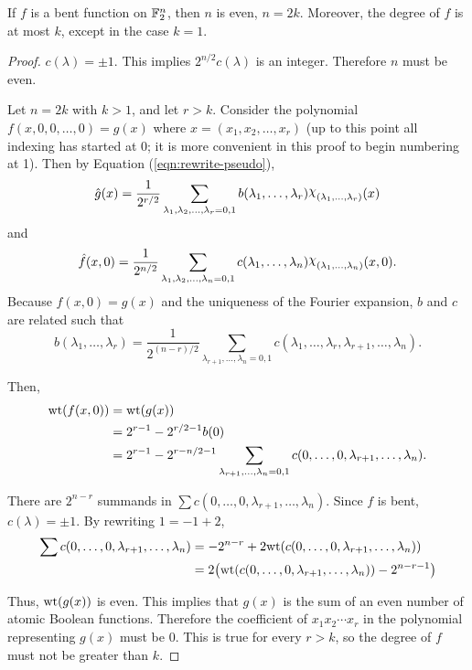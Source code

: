 \begin{proposition}{\rm \cite{art:r76}}
  If $f$ is a bent function on $\mathbb{F}_2^n$, then $n$ is even, $n=2k$.
  Moreover,
  the degree of $f$ is at most $k$, except in the case $k=1$.
\end{proposition}
\begin{proof}
  \par $c(\lambda)=\pm1$. This implies $2^{n/2}c(\lambda)$ is an
  integer. Therefore $n$ must be even.
  \par Let $n=2k$ with $k>1$, and let $r>k$. Consider the polynomial
  $f(x,\allowbreak 0,0,\dots,0)=\allowbreak g(x)$ where $x=(x_1,x_2,\dots,x_r)$
  (up to this point all indexing has
  started at 0; it is more convenient in this proof to begin numbering at
  1). Then by Equation (\ref{eqn:rewrite-pseudo}),
  \[
  \hat{g}(x)=\frac{1}{2^{r/2}}\sum_{\lambda_1,\lambda_2,\dots,\lambda_r=0,1}
    b(\lambda_1,\dots,\lambda_r)\Chi_{(\lambda_1,\ldots,\lambda_r)}(x)
  \]
  and
  \[
  \hat{f}(x,0)=\frac{1}{2^{n/2}}
    \sum_{\lambda_1,\lambda_2,\dots,\lambda_n=0,1}
    c(\lambda_1,\dots,\lambda_n)\Chi_{(\lambda_1,\ldots,\lambda_n)}(x,0).
  \]
  Because $f(x,0)=g(x)$ and the uniqueness of the Fourier expansion, $b$ and
  $c$ are related such that
  \[
  b(\lambda_1,\dots,\lambda_r)
    =\frac{1}{2^{(n-r)/2}}\sum_{\lambda_{r+1},\dots,\lambda_n=0,1}
    c(\lambda_1,\dots,\lambda_r,\lambda_{r+1},\dots,\lambda_n).
  \]
  \par Then,
  \begin{align*}
  {\rm wt}(f(x,0))&={\rm wt}(g(x))\\
    &=2^{r-1}-2^{r/2-1}b(0)\\
    &=2^{r-1}-2^{r-n/2-1}\sum_{\lambda_{r+1},\dots,\lambda_n=0,1}
      c(0,\dots,0,\lambda_{r+1},\dots,\lambda_n).
  \end{align*}
  \par There are $2^{n-r}$ summands in
  $\sum{c(0,\dots,0,\lambda_{r+1},\dots,\lambda_n)}.$ Since $f$ is bent,
  $c(\lambda)=\pm1$. By rewriting $1=-1+2$,
  \begin{align*}
    \sum{c(0,\dots,0,\lambda_{r+1},\dots,\lambda_n)}
      &=-2^{n-r}+2{\rm wt}(c(0,\dots,0,\lambda_{r+1},\dots,\lambda_n))\\
      &=2\big({\rm wt}(c(0,\dots,0,\lambda_{r+1},\dots,\lambda_n))-2^{n-r-1}\big)
  \end{align*}
  \par Thus, ${\rm wt}(g(x))$ is even. This implies that $g(x)$ is the sum of an
  even number of atomic Boolean functions. Therefore the coefficient of
  $x_1x_2\cdots x_r$ in the polynomial representing $g(x)$ must be 0. This
  is true for every $r>k$, so the degree of $f$ must not be greater than
  $k$.
\end{proof}

